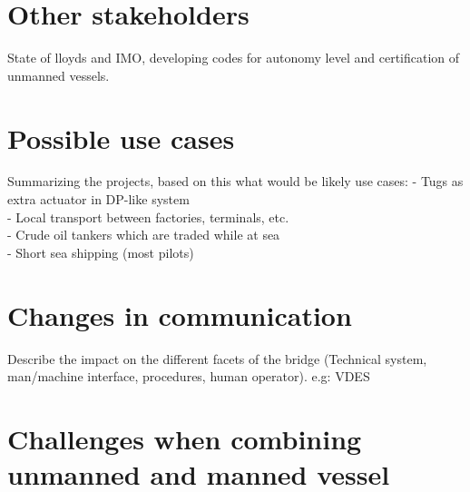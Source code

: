 \section{Other stakeholders}
State of lloyds and IMO, developing codes for autonomy level and certification of unmanned vessels.

\section{Possible use cases}
Summarizing the projects, based on this what would be likely use cases:
- Tugs as extra actuator in DP-like system \\
- Local transport between factories, terminals, etc. \\
- Crude oil tankers which are traded while at sea \\
- Short sea shipping (most pilots) \\

\section{Changes in communication}
Describe the impact on the different facets of the bridge (Technical system, man/machine interface, procedures, human operator).
e.g: VDES

\section{Challenges when combining unmanned and manned vessel}

